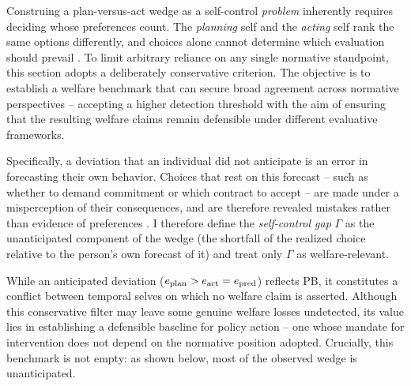 \documentclass[11pt,a4paper]{article}
\theoremstyle{plain}
\theoremstyle{definition}
\begin{document}
Construing a plan-versus-act wedge as a self-control \emph{problem} inherently requires deciding whose preferences count. The \textit{planning} self and the \textit{acting} self rank the same options differently, and choices alone cannot determine which evaluation should prevail \citep{bernheimrangel2009}. %
To limit arbitrary reliance on any single normative standpoint, this section adopts a deliberately conservative criterion. 
The objective is to establish a welfare benchmark that can secure broad agreement across normative perspectives -- accepting a higher detection threshold with the aim of ensuring that the resulting welfare claims remain defensible under different evaluative frameworks. %

Specifically, a deviation that an individual did not anticipate is an error in forecasting their own behavior. Choices that rest on this forecast -- such as whether to demand commitment or which contract to accept -- are made under a misperception of their consequences, and are therefore revealed mistakes rather than evidence of preferences \citep{bernheimrangel2009}. 
I therefore define the \emph{self-control gap} $\Gamma$ as the unanticipated component of the wedge (the shortfall of the realized choice relative to the person's own forecast of it) and treat only $\Gamma$ as welfare-relevant. 

While an anticipated deviation ($e_{\rm plan}>e_{\rm act}=e_{\rm pred}$) reflects PB, it constitutes a conflict between temporal selves on which no welfare claim is asserted. 
Although this conservative filter may leave some genuine welfare losses undetected, its value lies in establishing a defensible baseline for policy action -- one whose mandate for intervention does not depend on the normative position adopted. 
Crucially, this benchmark is not empty: as shown below, most of the observed wedge is unanticipated.
\end{document}
